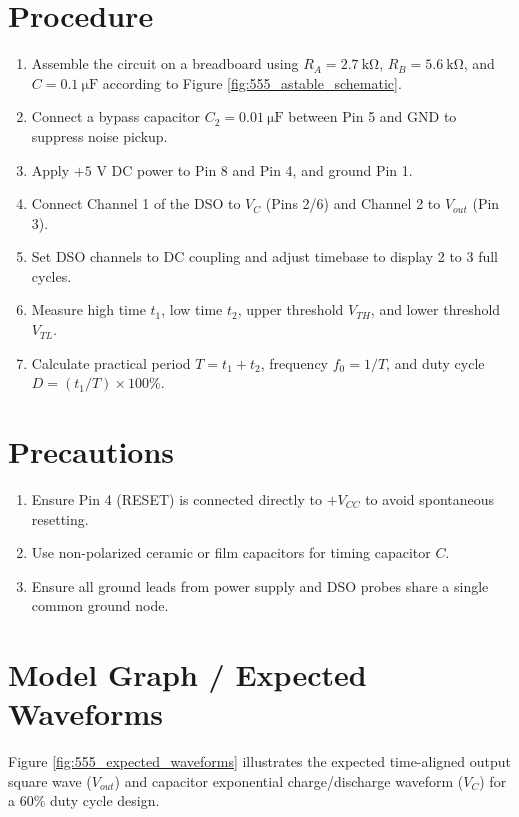 \section{Procedure}
\begin{enumerate}
	\item Assemble the circuit on a breadboard using $R_A = \SI{2.7}{\kilo\ohm}$, $R_B = \SI{5.6}{\kilo\ohm}$, and $C = \SI{0.1}{\micro\farad}$ according to Figure \ref{fig:555_astable_schematic}.
\item Connect a bypass capacitor $C_2 = \SI{0.01}{\micro\farad}$ between Pin 5 and GND to suppress noise pickup.
\item Apply $+5\text{ V}$ DC power to Pin 8 and Pin 4, and ground Pin 1.
\item Connect Channel 1 of the DSO to $V_C$ (Pins 2/6) and Channel 2 to $V_{out}$ (Pin 3).
\item Set DSO channels to DC coupling and adjust timebase to display 2 to 3 full cycles.
\item Measure high time $t_1$, low time $t_2$, upper threshold $V_{TH}$, and lower threshold $V_{TL}$.
\item Calculate practical period $T = t_1 + t_2$, frequency $f_0 = 1/T$, and duty cycle $D = (t_1/T) \times 100\%$.
\end{enumerate}

\section{Precautions}
\begin{enumerate}
\item Ensure Pin 4 (RESET) is connected directly to $+V_{CC}$ to avoid spontaneous resetting.
\item Use non-polarized ceramic or film capacitors for timing capacitor $C$.
\item Ensure all ground leads from power supply and DSO probes share a single common ground node.
\end{enumerate}

\section{Model Graph / Expected Waveforms}
Figure \ref{fig:555_expected_waveforms} illustrates the expected time-aligned output square wave ($V_{out}$) and capacitor exponential charge/discharge waveform ($V_C$) for a $60\%$ duty cycle design.

